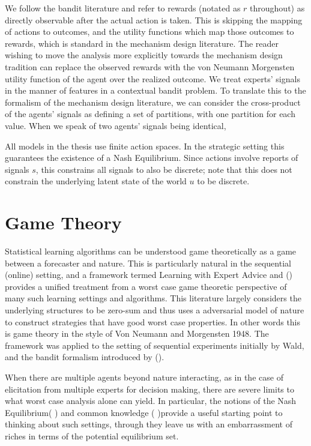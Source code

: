 We follow the bandit literature and refer to rewards (notated as $r$ throughout) as directly observable after the actual action is taken. This is skipping the mapping of actions to outcomes, and the utility functions which map those outcomes to rewards, which is standard in the mechanism design literature. The reader wishing to move the analysis more explicitly towards the mechanism design tradition can replace the observed rewards with the von Neumann Morgensten utility function of the agent over the realized outcome.
We treat experts' signals in the manner of features in a contextual bandit problem. To translate this to the formalism of the mechanism design literature, we can consider the cross-product of the agents' signals as defining a set of partitions, with one partition for each value. 
When we speak of two agents' signals being identical, 


All models in the thesis use finite action spaces. 
In the strategic setting this guarantees the existence of a Nash Equilibrium. 
Since actions involve reports of signals $s$, this constrains all signals to also be discrete; note that this does not constrain the underlying latent state of the world $u$ to be discrete.


\section{Game Theory}

Statistical learning algorithms can be understood game theoretically as a game between a forecaster and nature. This is particularly natural in the sequential (online) setting, and a framework termed Learning with Expert Advice and (\cite{cesa2006prediction}) provides a unified treatment from a worst case game theoretic perspective of many such learning settings and algorithms.
This literature largely considers the underlying structures to be zero-sum and thus uses a adversarial model of nature to construct strategies that have good worst case properties. In other words this is game theory in the style of Von Neumann and Morgensten 1948. The framework was applied to the setting of sequential experiments initially by Wald, and the bandit formalism introduced by (\cite{robbins1952some}).

When there are multiple agents beyond nature interacting, as in the case of elicitation from multiple experts for decision making, there are severe limits to what worst case analysis alone can yield. 
In particular, the notions of the Nash Equilibrium( \cite{nash1950equilibrium}) and common knowledge (\cite{aumann1976agreeing} )provide a useful starting point to thinking about such settings, through they leave us with an embarrassment of riches in terms of the potential equilibrium set.

